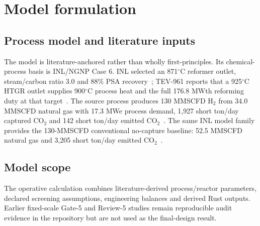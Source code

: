 \section{Model formulation}\label{sec:model-formulation}

\subsection{Process model and literature inputs}
The model is literature-anchored rather than wholly first-principles. Its chemical-process basis is INL/NGNP Case 6. INL selected an 871$^\circ$C reformer outlet, steam/carbon ratio 3.0 and 88\% PSA recovery~\cite{inltev953}; TEV-961 reports that a 925$^\circ$C HTGR outlet supplies 900$^\circ$C process heat and the full 176.8 MWth reforming duty at that target~\cite{inltev961}. The source process produces 130 MMSCFD H$_2$ from 34.0 MMSCFD natural gas with 17.3 MWe process demand, 1,927 short ton/day captured CO$_2$ and 142 short ton/day emitted CO$_2$~\cite{inltev961}. The same INL model family provides the 130-MMSCFD conventional no-capture baseline: 52.5 MMSCFD natural gas and 3,205 short ton/day emitted CO$_2$~\cite{inltev953}.


\subsection{Model scope}
The operative calculation combines literature-derived process/reactor parameters, declared screening assumptions, engineering balances and derived Rust outputs. Earlier fixed-scale Gate-5 and Review-5 studies remain reproducible audit evidence in the repository but are not used as the final-design result.

